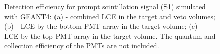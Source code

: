 \begin{figure}[!h]
\centering
{}
\caption[Detection efficiency for prompt scintillation signal (S1) simulated with GEANT4]{Detection efficiency for prompt scintillation signal (S1) simulated with GEANT4: (a) - combined LCE in the target and veto volumes; (b) - LCE by the bottom PMT array in the target volume; (c) - LCE by the top PMT array in the target volume. The quantum and collection efficiency of the PMTs are not included.}
\label{figLCEmapsS1}
\end{figure}

